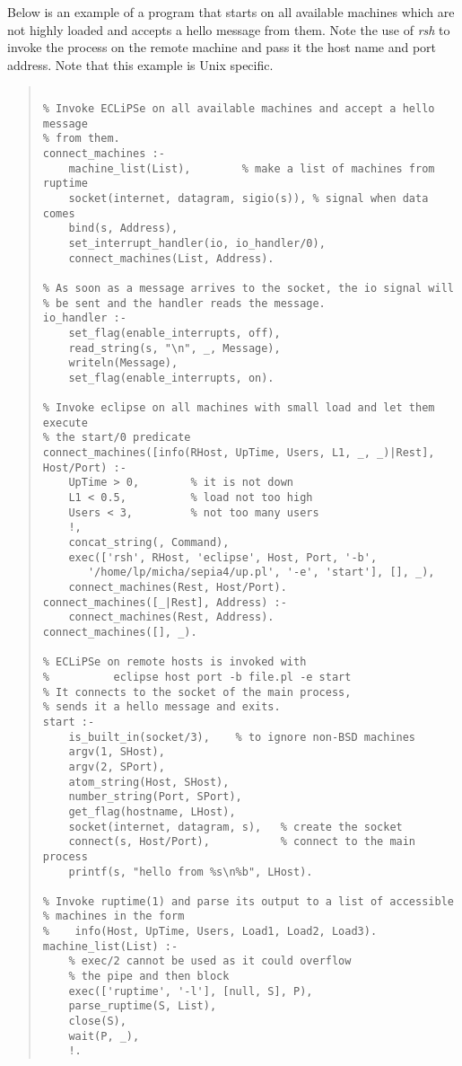 Below is an example of a program that starts {\eclipse} on all
available machines which are not highly loaded and accepts
a hello message from them.
Note the use of {\it rsh} to invoke the process on the remote machine
and pass it the host name and port address. Note that this example is Unix
specific. 
\begin{quote}
\begin{verbatim}

% Invoke ECLiPSe on all available machines and accept a hello message
% from them.
connect_machines :-
    machine_list(List),        % make a list of machines from ruptime
    socket(internet, datagram, sigio(s)), % signal when data comes
    bind(s, Address),
    set_interrupt_handler(io, io_handler/0),
    connect_machines(List, Address).

% As soon as a message arrives to the socket, the io signal will
% be sent and the handler reads the message.
io_handler :-
    set_flag(enable_interrupts, off),
    read_string(s, "\n", _, Message),
    writeln(Message),
    set_flag(enable_interrupts, on).

% Invoke eclipse on all machines with small load and let them execute
% the start/0 predicate
connect_machines([info(RHost, UpTime, Users, L1, _, _)|Rest], Host/Port) :-
    UpTime > 0,        % it is not down
    L1 < 0.5,          % load not too high
    Users < 3,         % not too many users
    !,
    concat_string(, Command),
    exec(['rsh', RHost, 'eclipse', Host, Port, '-b', 
       '/home/lp/micha/sepia4/up.pl', '-e', 'start'], [], _),
    connect_machines(Rest, Host/Port).
connect_machines([_|Rest], Address) :-
    connect_machines(Rest, Address).
connect_machines([], _).

% ECLiPSe on remote hosts is invoked with
%          eclipse host port -b file.pl -e start
% It connects to the socket of the main process,
% sends it a hello message and exits.
start :-
    is_built_in(socket/3),    % to ignore non-BSD machines
    argv(1, SHost),
    argv(2, SPort),
    atom_string(Host, SHost),
    number_string(Port, SPort),
    get_flag(hostname, LHost),
    socket(internet, datagram, s),   % create the socket
    connect(s, Host/Port),           % connect to the main process
    printf(s, "hello from %s\n%b", LHost).

% Invoke ruptime(1) and parse its output to a list of accessible
% machines in the form 
%    info(Host, UpTime, Users, Load1, Load2, Load3).
machine_list(List) :-
    % exec/2 cannot be used as it could overflow
    % the pipe and then block
    exec(['ruptime', '-l'], [null, S], P),
    parse_ruptime(S, List),
    close(S),
    wait(P, _),
    !.
\end{verbatim}
\end{quote}

